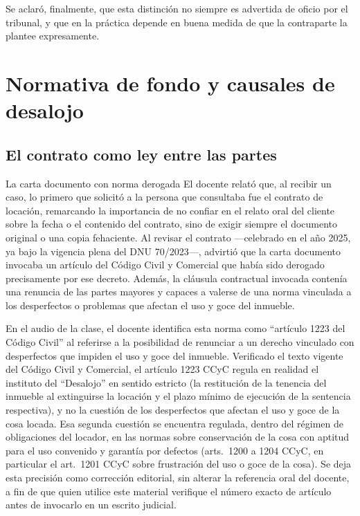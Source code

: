 \documentclass[12pt,oneside]{book}
\begin{document}
Se aclaró, finalmente, que esta distinción no siempre es advertida de oficio por el tribunal, y que en la práctica depende en buena medida de que la contraparte la plantee expresamente.

\chapter{Normativa de fondo y causales de desalojo}

\section{El contrato como ley entre las partes}

\begin{example}{La carta documento con norma derogada}
El docente relató que, al recibir un caso, lo primero que solicitó a la persona que consultaba fue el contrato de locación, remarcando la importancia de no confiar en el relato oral del cliente sobre la fecha o el contenido del contrato, sino de exigir siempre el documento original o una copia fehaciente. Al revisar el contrato —celebrado en el año 2025, ya bajo la vigencia plena del DNU 70/2023—, advirtió que la carta documento invocaba un artículo del Código Civil y Comercial que había sido derogado precisamente por ese decreto. Además, la cláusula contractual invocada contenía una renuncia de las partes mayores y capaces a valerse de una norma vinculada a los desperfectos o problemas que afectan el uso y goce del inmueble.
\end{example}

\begin{important}
En el audio de la clase, el docente identifica esta norma como ``artículo 1223 del Código Civil'' al referirse a la posibilidad de renunciar a un derecho vinculado con desperfectos que impiden el uso y goce del inmueble. Verificado el texto vigente del Código Civil y Comercial, el artículo 1223 CCyC regula en realidad el instituto del ``Desalojo'' en sentido estricto (la restitución de la tenencia del inmueble al extinguirse la locación y el plazo mínimo de ejecución de la sentencia respectiva), y no la cuestión de los desperfectos que afectan el uso y goce de la cosa locada. Esa segunda cuestión se encuentra regulada, dentro del régimen de obligaciones del locador, en las normas sobre conservación de la cosa con aptitud para el uso convenido y garantía por defectos (arts.\ 1200 a 1204 CCyC, en particular el art.\ 1201 CCyC sobre frustración del uso o goce de la cosa). Se deja esta precisión como corrección editorial, sin alterar la referencia oral del docente, a fin de que quien utilice este material verifique el número exacto de artículo antes de invocarlo en un escrito judicial.
\end{important}
\end{document}
